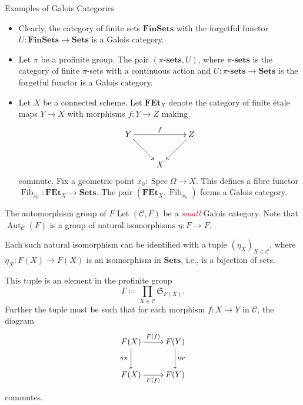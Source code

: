 \documentclass{beamer}
\newcommand{\frakS}{\mathfrak{S}} %
\newcommand{\catSets}{\mathbf{Sets}}
\newcommand{\sets}[1]{#1\text{-}\mathbf{sets}}
\newcommand{\catFinSets}{\mathbf{FinSets}}
\newcommand{\Aut}{\operatorname{Aut}}
\newcommand{\Spec}{\operatorname{Spec}}
\newcommand{\scrC}{\mathscr{C}} %
\newcommand{\caution}[1]{\textcolor{red}{\textit{#1}}}
\begin{document}
\begin{frame}{Examples of Galois Categories}
	\begin{itemize}
		\item Clearly, the category of finite sets $\catFinSets$ with the forgetful functor $U: \catFinSets\to\catSets$ is a Galois category. \pause 

		\item Let $\pi$ be a profinite group. The pair $(\sets{\pi}, U)$, where $\sets{\pi}$ is the category of finite $\pi$-sets with a continuous action and $U: \sets{\pi}\to\catSets$ is the forgetful functor is a Galois category. \pause 

		\item Let $X$ be a connected scheme. Let $\mathbf{FEt}_X$ denote the category of finite \'etale maps $Y\to X$ with morphisms $f: Y\to Z$ making 
		\begin{equation*}
			\xymatrix {
				Y\ar[rr]^f\ar[rd] & & Z\ar[ld]\\
				& X &
			}
		\end{equation*}
		commute. Fix a geometric point $x_0: \Spec\Omega\to X$. This defines a fibre functor $\operatorname{Fib}_{x_0}: \mathbf{FEt}_X\to\catSets$. The pair $\left(\mathbf{FEt}_X, \operatorname{Fib}_{x_0}\right)$ forms a Galois category.
	\end{itemize}
\end{frame}

\begin{frame}{The automorphism group of $F$}
	Let $(\scrC, F)$ be a \caution{small} Galois category. \pause 
	Note that $\Aut_{\scrC}(F)$ is a group of natural isomorphisms $\eta: F\to F$. \pause 

	Each such natural isomorphism can be identified with a tuple $(\eta_X)_{X\in\scrC}$, where $\eta_X: F(X)\to F(X)$ is an isomorphism in $\catSets$, i.e., is a bijection of sets. \pause 
	
	This tuple is an element in the profinite group
	\begin{equation*}
		\Gamma \coloneq \prod_{X\in\scrC}\frakS_{F(X)}.
	\end{equation*}\pause 
	Further the tuple must be such that for each morphism $f: X\to Y$ in $\scrC$, the diagram 
	\begin{equation*}
		\xymatrix {
			F(X)\ar[r]^{F(f)}\ar[d]_{\eta_X} & F(Y)\ar[d]^{\eta_Y}\\
			F(X)\ar[r]_{F(f)} & F(Y)
		}
	\end{equation*}
	commutes.
\end{frame}
\end{document}

